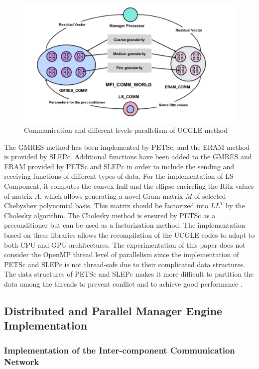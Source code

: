 \begin{figure}
	\centering
	\includegraphics[width=5.2in]{fig/GLSA_MPI.pdf}
	\caption{Communication and different levels parallelism of UCGLE method}
	\label{fig:glsa_mpi}
\end{figure}

The GMRES method has been implemented by PETSc, and the ERAM method is provided by SLEPc. Additional functions have been added to the GMRES and ERAM provided by PETSc and SLEPc in order to include the sending and receiving functions of different types of data. For the implementation of LS Component, it computes the convex hull and the ellipse encircling the Ritz values of matrix $A$, which allows generating a novel Gram matrix $M$ of selected Chebyshev polynomial basis. This matrix should be factorized into $LL^T$ by the Cholesky algorithm. The Cholesky method is ensured by PETSc as a preconditioner but can be used as a factorization method. The implementation based on these libraries allows the recompilation of the UCGLE codes to adapt to both CPU and GPU architectures. The experimentation of this paper does not consider the OpenMP thread level of parallelism since the implementation of PETSc and SLEPc is not thread-safe due to their complicated data structures. The data structures of PETSc and SLEPc makes it more difficult to partition the data among the threads to prevent conflict and to achieve good performance \cite{petsc-user-ref}.


\subsection{Distributed and Parallel Manager Engine Implementation}

\subsubsection{Implementation of the Inter-component Communication Network}

